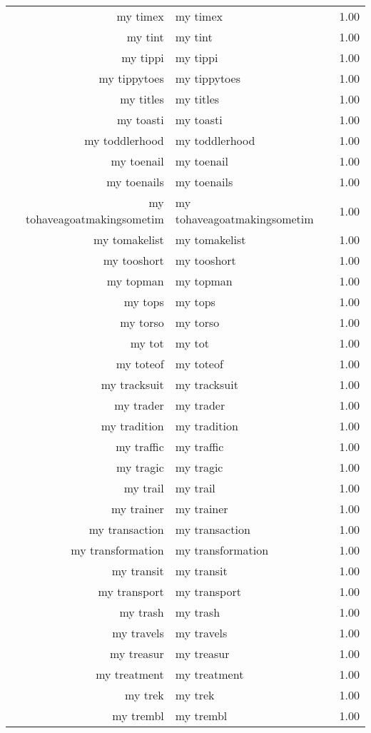 \begin{table}[ht]
\begin{tabular}{rlr}
  my timex & my timex & 1.00 \\ 
  my tint & my tint & 1.00 \\ 
  my tippi & my tippi & 1.00 \\ 
  my tippytoes & my tippytoes & 1.00 \\ 
  my titles & my titles & 1.00 \\ 
  my toasti & my toasti & 1.00 \\ 
  my toddlerhood & my toddlerhood & 1.00 \\ 
  my toenail & my toenail & 1.00 \\ 
  my toenails & my toenails & 1.00 \\ 
  my tohaveagoatmakingsometim & my tohaveagoatmakingsometim & 1.00 \\ 
  my tomakelist & my tomakelist & 1.00 \\ 
  my tooshort & my tooshort & 1.00 \\ 
  my topman & my topman & 1.00 \\ 
  my tops & my tops & 1.00 \\ 
  my torso & my torso & 1.00 \\ 
  my tot & my tot & 1.00 \\ 
  my toteof & my toteof & 1.00 \\ 
  my tracksuit & my tracksuit & 1.00 \\ 
  my trader & my trader & 1.00 \\ 
  my tradition & my tradition & 1.00 \\ 
  my traffic & my traffic & 1.00 \\ 
  my tragic & my tragic & 1.00 \\ 
  my trail & my trail & 1.00 \\ 
  my trainer & my trainer & 1.00 \\ 
  my transaction & my transaction & 1.00 \\ 
  my transformation & my transformation & 1.00 \\ 
  my transit & my transit & 1.00 \\ 
  my transport & my transport & 1.00 \\ 
  my trash & my trash & 1.00 \\ 
  my travels & my travels & 1.00 \\ 
  my treasur & my treasur & 1.00 \\ 
  my treatment & my treatment & 1.00 \\ 
  my trek & my trek & 1.00 \\ 
  my trembl & my trembl & 1.00 \\ 

\end{tabular}
\end{table}
